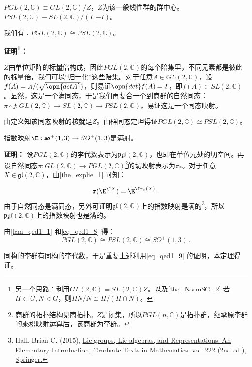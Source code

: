 \begin{lemma}{}\label{lem_qed1_1}
$PGL(2,\mathbb C)\equiv GL(2,\mathbb C)/Z$，$Z$为该一般线性群的群中心。$PSL(2,\mathbb C)\equiv SL(2,\mathbb C)/(I,-I)$。

我们有：$PGL(2,\mathbb C)\cong PSL(2,\mathbb C)$。

\textbf{证明\footnote{另一个思路：利用$GL(2,\mathbb C)=SL(2,\mathbb C)Z$。以及\autoref{the_NormSG_2} 若$H\subset G,N\vartriangleleft G$，则$HN/N\cong H/(H\cap N)$。}：}

$Z$由单位矩阵的标量倍构成，因此$PGL(2,\mathbb C)$的每个陪集里，不同元素都是彼此的标量倍，我们可以“归一化”这些陪集。对于任意$A\in GL(2,\mathbb C)$，设$f(A)=A/(\sqrt{\opn{det A}})$，则易证$\opn{det}f(A)=I$，即$f(A)\in SL(2,\mathbb C)$。显然，这是一个满同态，于是我们再复合一个到商群的自然同态：$\pi\circ f: GL(2,\mathbb C)\to SL(2,\mathbb C)\to PSL(2,\mathbb C)$。易证这是一个同态映射。

由定义知该同态映射的核就是$Z$。由群同态定理得证$PGL(2,\mathbb C)\cong PSL(2,\mathbb C)$。

\end{lemma}
\begin{theorem}{}
指数映射$\E:\mathfrak {so}^+(1,3)\to SO^+(1,3)$是满射。
\end{theorem}


\textbf{证明：}
设$PGL(2,\mathbb C)$的李代数表示为$\mathfrak{pgl}(2,\mathbb C)$，也即在单位元处的切空间。再设自然同态$\pi:GL(2,\mathbb C)\to PGL(2,\mathbb C)$\footnote{商群的拓扑结构见\href{https://wuli.wiki/online/Topo7.html}{商拓扑}。$Z$是闭集，所以$PGL(n,\mathbb C)$是拓扑群，继承原李群的乘积映射运算后，该商群为李群。}的切映射表示为$\pi_*$。对于任意$X\in \mathfrak{gl}(2,\mathbb C)$，由\autoref{the_explie_1} 可知：

\begin{equation}\label{eq_qed1_9}
\pi(\E^{\I X})=\E^{\I\pi_*(X)}~.
\end{equation}
由于自然同态是满同态，另外可证明$\mathfrak{gl}(2,\mathbb C)$上的指数映射是满的\footnote{Hall, Brian C. (2015), \href{https://link.springer.com/book/10.1007/978-3-319-13467-3}{Lie groups, Lie algebras, and Representations: An Elementary Introduction, Graduate Texts in Mathematics, vol. 222 (2nd ed.), Springer.}}，所以$\mathfrak{pgl}(2,\mathbb C)$上的指数映射也是满的。


由\autoref{lem_qed1_1} 和\autoref{eq_qed1_8} 得：
\begin{equation}
PGL(2,\mathbb C)\cong PSL(2,\mathbb C)\cong SO^+(1,3)~.
\end{equation}

同构的李群有同构的李代数，于是重复上述利用\autoref{eq_qed1_9} 的证明，本定理得证。


























